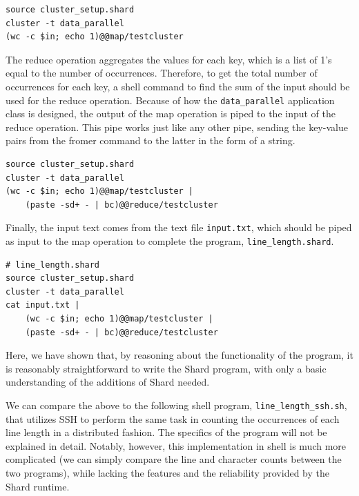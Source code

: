 \documentclass[oneside]{report}
\begin{document}
\begin{minipage}[c]{\textwidth-15pt}
  \begin{lstlisting}[language=Shard]
source cluster_setup.shard
cluster -t data_parallel
(wc -c $in; echo 1)@@map/testcluster
\end{lstlisting}
  \smallskip
\end{minipage}

The reduce operation aggregates the values for each key, which is a list of 1's equal to the number of occurrences.
Therefore, to get the total number of occurrences for each key, a shell command to find the sum of the input should be used for the reduce operation.
Because of how the \texttt{data\_parallel} application class is designed, the output of the map operation is piped to the input of the reduce operation. This pipe works just like any other pipe, sending the key-value pairs from the fromer command to the latter in the form of a string.

\begin{minipage}[c]{\textwidth-15pt}
  \begin{lstlisting}[language=Shard]
source cluster_setup.shard
cluster -t data_parallel
(wc -c $in; echo 1)@@map/testcluster |
    (paste -sd+ - | bc)@@reduce/testcluster
\end{lstlisting}
  \smallskip
\end{minipage}

Finally, the input text comes from the text file \texttt{input.txt}, which should be piped as input to the map operation to complete the program, \texttt{line\_length.shard}.

\begin{minipage}[c]{\textwidth-15pt}
  \begin{lstlisting}[language=Shard]
# line_length.shard
source cluster_setup.shard
cluster -t data_parallel
cat input.txt |
    (wc -c $in; echo 1)@@map/testcluster |
    (paste -sd+ - | bc)@@reduce/testcluster
\end{lstlisting}
  \smallskip
\end{minipage}

Here, we have shown that, by reasoning about the functionality of the program, it is reasonably straightforward to write the Shard program, with only a basic understanding of the additions of Shard needed.

We can compare the above to the following shell program, \texttt{line\_length\_ssh.sh}, that utilizes SSH to perform the same task in counting the occurrences of each line length in a distributed fashion.
The specifics of the program will not be explained in detail.
Notably, however, this implementation in shell is much more complicated (we can simply compare the line and character counts between the two programs), while lacking the features and the reliability provided by the Shard runtime.
\end{document}
